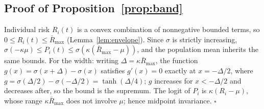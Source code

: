 \documentclass[]{interact}
\begin{document}
\subsection*{Proof of Proposition~\ref{prop:band}}
Individual risk $R_i(t)$ is a convex combination of nonnegative bounded terms, so $0 \le R_i(t) \le \bar{R}_{\max}$ (Lemma~\ref{lem:envelope}). Since $\sigma$ is strictly increasing, $\sigma(-\kappa\mu) \le P_i(t) \le \sigma(\kappa(\bar{R}_{\max}-\mu))$, and the population mean inherits the same bounds. For the width: writing $\Delta = \kappa \bar{R}_{\max}$, the function $g(x) = \sigma(x+\Delta) - \sigma(x)$ satisfies $g'(x) = 0$ exactly at $x = -\Delta/2$, where $g = \sigma(\Delta/2) - \sigma(-\Delta/2) = \tanh(\Delta/4)$; $g$ increases for $x < -\Delta/2$ and decreases after, so the bound is the supremum. The logit of $P_i$ is $\kappa(R_i - \mu)$, whose range $\kappa \bar{R}_{\max}$ does not involve $\mu$; hence midpoint invariance. $\square$



\end{document}
